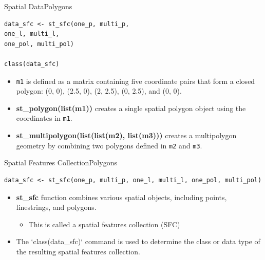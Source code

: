 \documentclass[dvipsnames,hyperref={pdfpagelabels=false}]{beamer}
\begin{document}
\begin{frame}[fragile]{Spatial Data}{Polygons}
\begin{lstlisting}
data_sfc <- st_sfc(one_p, multi_p,
one_l, multi_l,
one_pol, multi_pol)

class(data_sfc)
\end{lstlisting}
\begin{itemize}
	\item \texttt{m1} is defined as a matrix containing five coordinate pairs that form a closed polygon: (0, 0), (2.5, 0), (2, 2.5), (0, 2.5), and (0, 0).
	\vspace{0.2cm}
	\item \textbf{st\_polygon(list(m1))} creates a single spatial polygon object using the coordinates in \texttt{m1}.
	\vspace{0.2cm}
	\item \textbf{st\_multipolygon(list(list(m2), list(m3)))} creates a multipolygon geometry by combining two polygons defined in \texttt{m2} and \texttt{m3}.
\end{itemize}
\end{frame}




\begin{frame}[fragile]{Spatial Features Collection}{Polygons}
\begin{lstlisting}
data_sfc <- st_sfc(one_p, multi_p, one_l, multi_l, one_pol, multi_pol)
\end{lstlisting}
\begin{itemize}
	\item \textbf{st\_sfc} function combines various spatial objects, including points, linestrings, and polygons.
	\vspace{0.2cm}
	\begin{itemize}
	\item This is called a spatial features collection (SFC)
\end{itemize}
		\vspace{0.2cm}
	\item The `class(data\_sfc)` command is used to determine the class or data type of the resulting spatial features collection.
\end{itemize}
\end{frame}
\end{document}
